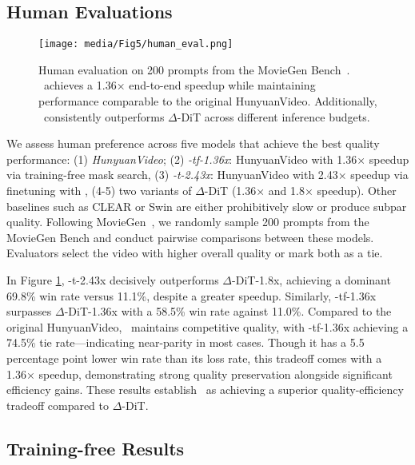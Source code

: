 \subsection{Human Evaluations}


\begin{figure}[t]
    \centering
    \texttt{[image: media/Fig5/human\_eval.png]} %
    \caption{Human evaluation on 200 prompts from the MovieGen Bench~\citep{polyak2024movie}. \methodnameshort~achieves a 1.36× end-to-end speedup while maintaining performance comparable to the original HunyuanVideo. Additionally, \methodnameshort~consistently outperforms $\Delta$-DiT across different inference budgets.}
    \label{fig:Human_Evaluation}
\end{figure}


\label{sec:human_eval}
We assess human preference across five models that achieve the best quality performance:
(1) \emph{HunyuanVideo}; 
(2) \emph{\methodnameshort-tf-1.36x}: HunyuanVideo with 1.36× speedup via training-free mask search, 
(3) \emph{\methodnameshort-t-2.43x}: HunyuanVideo with 2.43× speedup via finetuning with \methodnameshort, (4-5) two variants of $\Delta$-DiT (1.36× and 1.8× speedup). Other baselines such as CLEAR or Swin are either prohibitively slow or produce subpar quality. Following MovieGen~\citep{polyak2024movie}, we randomly sample 200 prompts from the MovieGen Bench and conduct pairwise comparisons between these models. Evaluators select the video with higher overall quality or mark both as a tie.

In Figure \ref{fig:Human_Evaluation}, \methodnameshort-t-2.43x decisively outperforms $\Delta$-DiT-1.8x, achieving a dominant 69.8\% win rate versus 11.1\%, despite a greater speedup. Similarly, \methodnameshort-tf-1.36x surpasses $\Delta$-DiT-1.36x with a 58.5\% win rate against 11.0\%. Compared to the original HunyuanVideo, \methodnameshort~maintains competitive quality, with \methodnameshort-tf-1.36x achieving a 74.5\% tie rate—indicating near-parity in most cases. Though it has a 5.5 percentage point lower win rate than its loss rate, this tradeoff comes with a 1.36× speedup, demonstrating strong quality preservation alongside significant efficiency gains. These results establish \methodnameshort~as achieving a superior quality-efficiency tradeoff compared to $\Delta$-DiT.

\subsection{Training-free Results}


